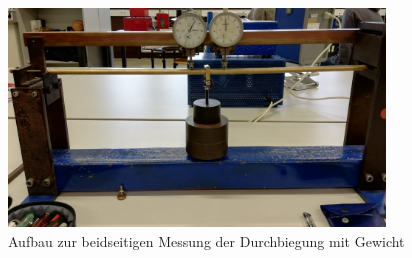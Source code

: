 \begin{figure}[H]
    \centering
    \includegraphics[width=10cm]{4.jpg}
    \caption{Aufbau zur beidseitigen Messung der Durchbiegung mit Gewicht}
    \label{fig:durchfuehrung4}
\end{figure}
